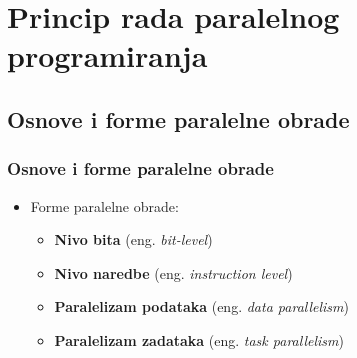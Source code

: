 \documentclass{beamer}
\begin{document}
	\section{Princip rada paralelnog programiranja}
	\subsection{Osnove i forme paralelne obrade}
	\begin{frame}[fragile]\frametitle{Osnove i forme paralelne obrade}
		\begin{itemize}	
			\item Forme paralelne obrade:
			\begin{itemize}
				\item \textbf{Nivo bita} (eng. \emph{bit-level})
				\item \textbf{Nivo naredbe} (eng. \emph{instruction level})
				\item \textbf{Paralelizam podataka} (eng. \emph{data parallelism})
				\item \textbf{Paralelizam zadataka} (eng. \emph{task parallelism})
			\end{itemize}
		\end{itemize}
		\begin{table}[h]
			\begin{center}
				\caption{Modeli izračunavanja efikasnosti paralelne obrade}
			\end{center}
		\end{table}
	\end{frame}
\end{document}
